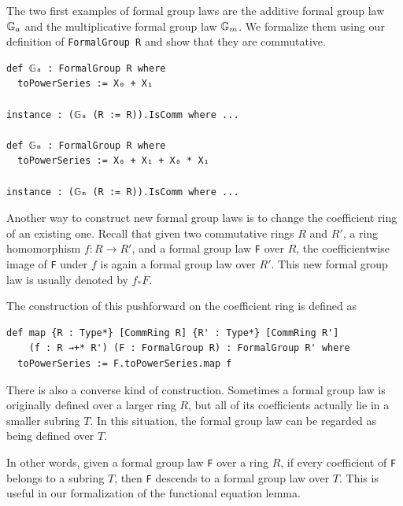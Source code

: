 The two first examples of formal group laws are the additive formal group law
$\mathbb{G}_a$ and the
multiplicative formal group law $\mathbb{G}_m$. We formalize them using
our definition of \lstinline{FormalGroup R} and show that
they are commutative.
\begin{lstlisting}
def 𝔾ₐ : FormalGroup R where
  toPowerSeries := X₀ + X₁

instance : (𝔾ₐ (R := R)).IsComm where ...

def 𝔾ₘ : FormalGroup R where
  toPowerSeries := X₀ + X₁ + X₀ * X₁

instance : (𝔾ₘ (R := R)).IsComm where ...
\end{lstlisting}



Another way to construct new formal group laws is to change the
coefficient ring of an existing one.
Recall that given two commutative rings $R$ and $R'$, a ring
homomorphism $f : R \to R'$, and a formal group law
\lstinline|F| over $R$, the coefficientwise image of \lstinline|F| under
$f$ is again a formal group law over $R'$.  This new formal group
law is usually denoted by $f_* F$.

The construction of this pushforward on the coefficient ring is defined as
\href{https://github.com/WenrongZou/FormalGroupLaws/blob/main/FormalGroupLaws/Basic.lean}{\faExternalLink}

\begin{lstlisting}
def map {R : Type*} [CommRing R] {R' : Type*} [CommRing R']
    (f : R →+* R') (F : FormalGroup R) : FormalGroup R' where
  toPowerSeries := F.toPowerSeries.map f
\end{lstlisting}

There is also a converse kind of construction.  Sometimes a formal group
law is originally defined over a larger ring $R$, but all of its
coefficients actually lie in a smaller subring $T$.  In this situation,
the formal group law can be regarded as being defined over $T$.

In other words, given a formal group law \lstinline|F| over a ring $R$,
if every coefficient of \lstinline|F| belongs to a subring $T$, then
\lstinline|F| descends to a formal group law over $T$.  This is useful
in our formalization of the functional equation lemma.

